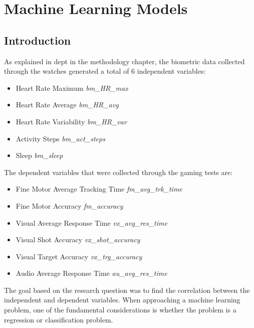 \chapter{Machine Learning Models}

\section{Introduction}
As explained in dept in the methodology chapter, the biometric data collected through the watches generated a total of 6 independent variables:

\begin{itemize}
    \item Heart Rate Maximum \textit{bm\_HR\_max}
    \item Heart Rate Average \textit{bm\_HR\_avg}
    \item Heart Rate Variability \textit{bm\_HR\_var}
    \item Activity Steps \textit{bm\_act\_steps}
    \item Sleep \textit{bm\_sleep}
\end{itemize}

The dependent variables that were collected through the gaming tests are:

\begin{itemize}
    \item Fine Motor Average Tracking Time \textit{fm\_avg\_trk\_time}
    \item Fine Motor Accuracy \textit{fm\_accuracy}
    \item Visual Average Response Time \textit{vx\_avg\_res\_time}
    \item Visual Shot Accuracy \textit{vx\_shot\_accuracy}
    \item Visual Target Accuracy \textit{vx\_trg\_accuracy}
    \item Audio Average Response Time \textit{au\_avg\_res\_time}
\end{itemize}

The goal based on the research question was to find the correlation between the independent and dependent variables. When approaching a machine learning problem, one of the fundamental
considerations is whether the problem is a regression or classification problem. 


